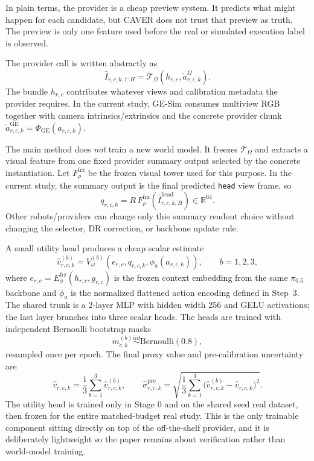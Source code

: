 \documentclass[10pt]{article}
\theoremstyle{plain}
\theoremstyle{definition}
\theoremstyle{remark}
\begin{document}
In plain terms, the provider is a cheap preview system. It predicts what might happen for each candidate, but CAVER does not trust that preview as truth. The preview is only one feature used before the real or simulated execution label is observed.

The provider call is written abstractly as
\[
\hat I_{r,c,k,1:H}=\mathcal T_{\Omega}(h_{r,c},\tilde a^{\Omega}_{r,c,k}).
\]
The bundle $h_{r,c}$ contributes whatever views and calibration metadata the provider requires. In the current study, GE-Sim consumes multiview RGB together with camera intrinsics/extrinsics and the concrete provider chunk $\tilde a^{\mathrm{GE}}_{r,c,k}=\Phi_{\mathrm{GE}}(a_{r,c,k})$.

The main method does \emph{not} train a new world model. It freezes $\mathcal T_{\Omega}$ and extracts a visual feature from one fixed provider summary output selected by the concrete instantiation. Let $F_{\rho}^{\mathrm{frz}}$ be the frozen visual tower used for this purpose. In the current study, the summary output is the final predicted \texttt{head} view frame, so
\[
q_{r,c,k}=R\,F_{\rho}^{\mathrm{frz}}(\hat I^{\mathrm{head}}_{r,c,k,H})\in\mathbb R^{64}.
\]
Other robots/providers can change only this summary readout choice without changing the selector, DR correction, or backbone update rule.

A small utility head produces a cheap scalar estimate
\[
\hat v^{(b)}_{r,c,k}=V_{\omega}^{(b)}(e_{r,c},q_{r,c,k},\phi_a(a_{r,c,k})),\qquad b=1,2,3,
\]
where $e_{r,c}=E_{\phi}^{\mathrm{frz}}(h_{r,c},g_{r,c})$ is the frozen context embedding from the same $\pi_{0.5}$ backbone and $\phi_a$ is the normalized flattened action encoding defined in Step~3. The shared trunk is a 2-layer MLP with hidden width 256 and GELU activations; the last layer branches into three scalar heads. The heads are trained with independent Bernoulli bootstrap masks
\[
m^{(b)}_{c,k}\stackrel{iid}{\sim}\mathrm{Bernoulli}(0.8),
\]
resampled once per epoch. The final proxy value and pre-calibration uncertainty are
\[
\hat v_{r,c,k}=\frac{1}{3}\sum_{b=1}^{3}\hat v^{(b)}_{r,c,k},\qquad
\hat\sigma^{\mathrm{pre}}_{r,c,k}=\sqrt{\frac{1}{3}\sum_{b=1}^{3}\big(\hat v^{(b)}_{r,c,k}-\hat v_{r,c,k}\big)^2}.
\]
The utility head is trained only in Stage 0 and on the shared seed real dataset, then frozen for the entire matched-budget real study. This is the only trainable component sitting directly on top of the off-the-shelf provider, and it is deliberately lightweight so the paper remains about verification rather than world-model training.
\end{document}
